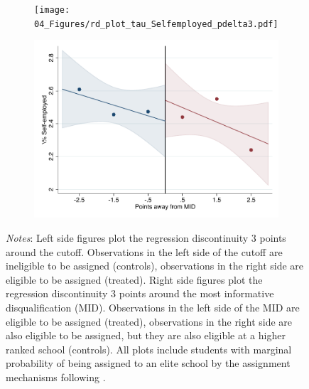 \documentclass[oneside,11pt]{article}
\begin{document}
\begin{figure}[H]

    \ContinuedFloat
    \caption{(Cont.) RD plots for outcome variables across those assigned to either UNAM or IPN high-school, and those who are not\label{fig:ITT_rd_plot_elite_6}}
    \begin{center}
    
    \begin{subfigure}{0.475\textwidth}
        \centering
        \texttt{[image: 04\_Figures/rd\_plot\_tau\_Selfemployed\_pdelta3.pdf]}
    \end{subfigure}
    \begin{subfigure}{0.475\textwidth}
        \centering
        \includegraphics[width=\textwidth]{04_Figures/rd_plot_mid_Selfemployed_pdelta3.pdf}
    \end{subfigure}
    \end{center}
    
\footnotesize
\textit{Notes}: Left side figures plot the regression discontinuity 3 points around the cutoff. Observations in the left side of the cutoff are ineligible to be assigned (controls), observations in the right side are eligible to be assigned (treated). Right side figures plot the regression discontinuity 3 points around the most informative disqualification (MID). Observations in the left side of the MID are eligible to be assigned (treated), observations in the right side are also eligible to be assigned, but they are also eligible at a higher ranked school (controls). All plots include students with marginal probability of being assigned to an elite school by the assignment mechanisms following \citet{abdulkadirouglu2022breaking}. 
\end{figure}
\end{document}
